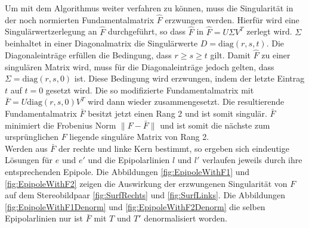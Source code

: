 
Um mit dem Algorithmus weiter verfahren zu können, muss die Singularität in der noch normierten Fundamentalmatrix $\hat{F}$ erzwungen werden\cite{HZ}. Hierfür wird eine Singulärwertzerlegung an $\hat{F}$ durchgeführt, so dass $\hat{F}$ in $\hat{F} = U\Sigma V^T$ zerlegt wird. $\Sigma$ beinhaltet in einer Diagonalmatrix die Singulärwerte $D = \text{diag}(r,s,t)$. Die Diagonaleinträge erfüllen die Bedingung, dass $r \geq s \geq t $ gilt. Damit $\hat{F}$ zu einer singulären Matrix wird, muss für die Diagonaleinträge jedoch gelten, dass  $\Sigma = \text{diag}(r,s,0)$ ist. Diese Bedingung wird erzwungen, indem der letzte Eintrag $t$ auf $t = 0$ gesetzt wird. Die so modifizierte Fundamentalmatrix mit $\bar{F} = U\text{diag}(r,s,0)V^T$ wird dann wieder zusammengesetzt. Die resultierende Fundamentalmatrix $\bar{F}$ besitzt jetzt einen Rang 2 und ist somit singulär\cite{HZ}. $\bar{F}$ minimiert die Frobenius Norm $\parallel F -\bar{F} \parallel$ und ist somit die nächste zum ursprünglichen $F$ liegende singuläre Matrix von Rang 2\cite{HZ,HZ8,FormelsammlungMatrizen}. \\

Werden aus $\bar{F}$ der rechte und linke Kern bestimmt, so ergeben sich eindeutige Lösungen für $e$ und $e'$ und die Epipolarlinien $l$ und $l'$ verlaufen jeweils durch ihre entsprechenden Epipole\cite{HZ}. Die Abbildungen \ref{fig:EpipoleWithF1} und \ref{fig:EpipoleWithF2} zeigen die Auswirkung der erzwungenen Singularität von $F$ auf dem Stereobildpaar \ref{fig:SurfRechts} und \ref{fig:SurfLinks}. Die Abbildungen \ref{fig:EpipoleWithF1Denorm} und \ref{fig:EpipoleWithF2Denorm} die selben Epipolarlinien nur ist $\bar{F}$ mit $T$ und $T'$ denormalisiert worden.\\



% 


